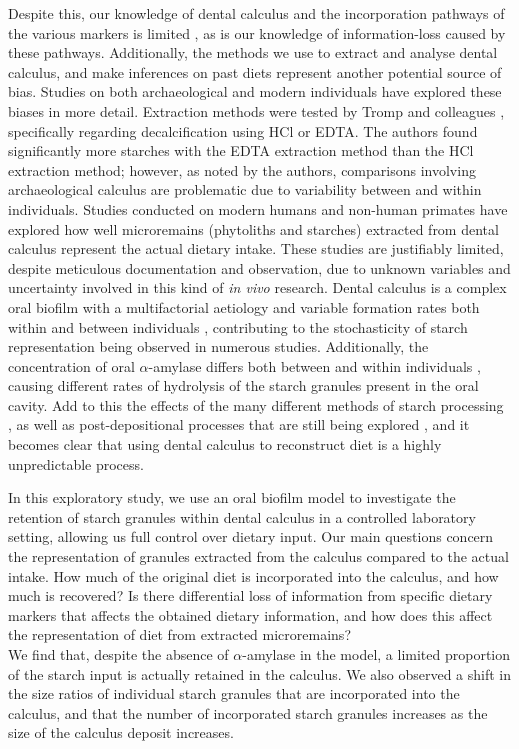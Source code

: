 \documentclass[utf8]{../templates/frontiersSCNS}
\begin{document}
Despite this, our knowledge of dental calculus and the incorporation pathways of
the various markers is limited \citep{radiniFoodPathways2017}, as is our
knowledge of information-loss caused by these pathways. Additionally, the methods
we use to extract and analyse dental calculus, and make inferences on past diets
represent another potential source of bias. Studies on both archaeological and
modern individuals have explored these biases in more detail.
Extraction methods were tested
by Tromp and colleagues \citeyearpar{trompEDTACalculus2017}, specifically regarding
decalcification using HCl or EDTA.
The authors found significantly more starches with the EDTA extraction method
than the HCl extraction method; however, as noted by the authors, comparisons
involving archaeological calculus are problematic due to variability between and
within individuals.
Studies conducted on modern humans \citep{leonardPlantMicroremains2015}
and non-human primates \citep{powerChimpCalculus2015, powerRepresentativenessDental2021}
have explored how well microremains (phytoliths and starches)
extracted from dental calculus represent the actual dietary intake.
These studies are justifiably limited,
despite meticulous documentation and observation, due to unknown variables and
uncertainty involved in this kind of \emph{in vivo} research. Dental calculus is a complex
oral biofilm with a multifactorial aetiology and variable formation rates both
within and between individuals \citep{jepsenCalculusRemoval2011, haffajeeBiofilmPosition2009},
contributing to
the stochasticity of starch representation being observed in numerous studies.
Additionally, the concentration of oral \(\alpha\)-amylase differs both between and
within individuals \citep{froehlichEffectOral1987, naterHumanAmylase2005},
causing different rates of hydrolysis of the starch granules present in the oral
cavity. Add to this the effects of the many different methods
of starch processing \citep{hardyRecoveringInformation2018}, as well as post-depositional
processes that are still being explored
\citep{graneroStarchTaphonomy2020, mercaderExaggeratedExpectations2018},
and it becomes clear that using
dental calculus to reconstruct diet is a highly unpredictable process.

In this exploratory study, we use an oral biofilm model to investigate the
retention of starch granules within dental calculus in a controlled laboratory
setting, allowing us full control over dietary input. Our main questions concern
the representation of granules extracted
from the calculus compared to the actual intake. How much of the original diet is
incorporated into the calculus, and how much is recovered?
Is there differential loss of information from specific dietary markers that affects
the obtained dietary information, and how does this affect the representation of
diet from extracted microremains?\\
We find that, despite the absence of \(\alpha\)-amylase in
the model, a limited proportion of the starch input is actually
retained in the calculus. We also observed a shift in the size ratios of individual
starch granules that are incorporated into the calculus, and that the number of
incorporated starch granules increases as the size of the calculus deposit
increases.
\end{document}
